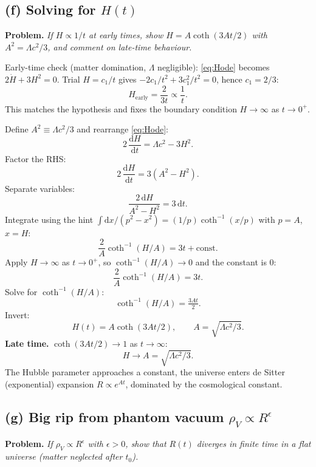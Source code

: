 \documentclass[11pt]{article}
\newcommand{\de}{\mathrm{d}}
\begin{document}
\subsection*{(f) Solving for $H(t)$}

\textbf{Problem.} \emph{If $H\propto 1/t$ at early times, show $H = A\coth(3At/2)$ with $A^2 = \Lambda c^2/3$, and comment on late-time behaviour.}

Early-time check (matter domination, $\Lambda$ negligible): \eqref{eq:Hode} becomes $2\dot H + 3H^2 = 0$. Trial $H = c_1/t$ gives $-2c_1/t^2 + 3c_1^2/t^2 = 0$, hence $c_1 = 2/3$:
\[
H_{\mathrm{early}} = \frac{2}{3t} \propto \frac{1}{t}.
\]
This matches the hypothesis and fixes the boundary condition $H\to\infty$ as $t\to 0^+$.

Define $A^2 \equiv \Lambda c^2/3$ and rearrange \eqref{eq:Hode}:
\[
2\,\frac{\de H}{\de t} = \Lambda c^2 - 3 H^2.
\]
Factor the RHS:
\[
2\,\frac{\de H}{\de t} = 3(A^2 - H^2).
\]
Separate variables:
\[
\frac{2\,\de H}{A^2 - H^2} = 3\,\de t.
\]
Integrate using the hint $\int\de x/(p^2-x^2) = (1/p)\coth^{-1}(x/p)$ with $p=A$, $x=H$:
\[
\frac{2}{A}\coth^{-1}(H/A) = 3 t + \mathrm{const}.
\]
Apply $H\to\infty$ as $t\to 0^+$, so $\coth^{-1}(H/A)\to 0$ and the constant is $0$:
\[
\frac{2}{A}\coth^{-1}(H/A) = 3 t.
\]
Solve for $\coth^{-1}(H/A)$:
\[
\coth^{-1}(H/A) = \tfrac{3At}{2}.
\]
Invert:
\[
\boxed{\;H(t) = A\coth(3At/2),\qquad A = \sqrt{\Lambda c^2/3}.\;}
\]
\textbf{Late time.} $\coth(3At/2)\to 1$ as $t\to\infty$:
\[
H \to A = \sqrt{\Lambda c^2/3}.
\]
The Hubble parameter approaches a constant, the universe enters de Sitter (exponential) expansion $R\propto e^{At}$, dominated by the cosmological constant.

\subsection*{(g) Big rip from phantom vacuum $\rho_V\propto R^\epsilon$}

\textbf{Problem.} \emph{If $\rho_V\propto R^\epsilon$ with $\epsilon > 0$, show that $R(t)$ diverges in finite time in a flat universe (matter neglected after $t_0$).}
\end{document}

